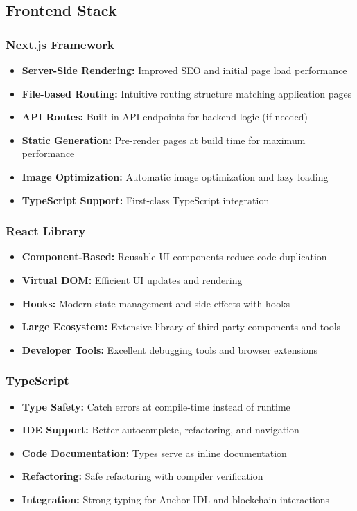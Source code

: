 \documentclass[a4paper,13pt,twoside]{report}
\theoremstyle{definition}
\begin{document}
\subsection{Frontend Stack}

\subsubsection{Next.js Framework}

\begin{itemize}
    \item \textbf{Server-Side Rendering:} Improved SEO and initial page load performance
    \item \textbf{File-based Routing:} Intuitive routing structure matching application pages
    \item \textbf{API Routes:} Built-in API endpoints for backend logic (if needed)
    \item \textbf{Static Generation:} Pre-render pages at build time for maximum performance
    \item \textbf{Image Optimization:} Automatic image optimization and lazy loading
    \item \textbf{TypeScript Support:} First-class TypeScript integration
\end{itemize}

\subsubsection{React Library}

\begin{itemize}
    \item \textbf{Component-Based:} Reusable UI components reduce code duplication
    \item \textbf{Virtual DOM:} Efficient UI updates and rendering
    \item \textbf{Hooks:} Modern state management and side effects with hooks
    \item \textbf{Large Ecosystem:} Extensive library of third-party components and tools
    \item \textbf{Developer Tools:} Excellent debugging tools and browser extensions
\end{itemize}

\subsubsection{TypeScript}

\begin{itemize}
    \item \textbf{Type Safety:} Catch errors at compile-time instead of runtime
    \item \textbf{IDE Support:} Better autocomplete, refactoring, and navigation
    \item \textbf{Code Documentation:} Types serve as inline documentation
    \item \textbf{Refactoring:} Safe refactoring with compiler verification
    \item \textbf{Integration:} Strong typing for Anchor IDL and blockchain interactions
\end{itemize}
\end{document}
